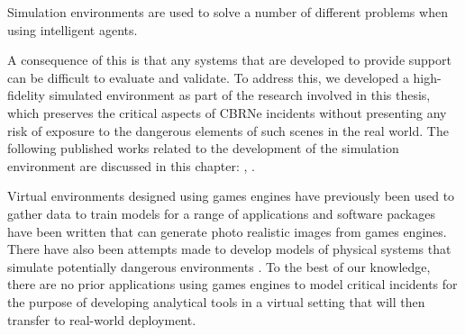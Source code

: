 
Simulation environments are used to solve a number of different problems when using intelligent agents.

A consequence of this is that any systems that are developed to provide support can be difficult to evaluate and validate. To address this, we developed a high-fidelity simulated environment as part of the research involved in this thesis, which preserves the critical aspects of CBRNe incidents without presenting any risk of exposure to the dangerous elements of such scenes in the real world. The following published works related to the development of the simulation environment are discussed in this chapter: \citet{Smyth2018AInvestigation}, \citet{Smyth2018UsingDrones}.\par


Virtual environments designed using games engines have previously been used to gather data to train models for a range of applications \cite{1608.02192}\cite{uav_benchmark_simulator} and software packages have been written that can generate photo realistic images from games engines\cite{1609.01326}. There have also been attempts made to develop models of physical systems that simulate potentially dangerous environments \cite{4625089}. To the best of our knowledge, there are no prior applications using games engines to model critical incidents for the purpose of developing analytical tools in a virtual setting that will then transfer to real-world deployment.